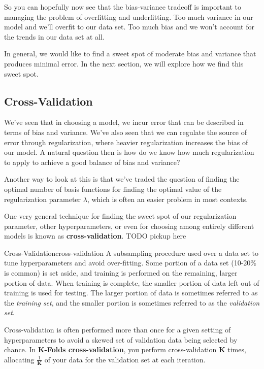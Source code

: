 So you can hopefully now see that the bias-variance tradeoff is important to managing the problem of overfitting and underfitting. Too much variance in our model and we'll overfit to our data set. Too much bias and we won't account for the trends in our data set at all.

In general, we would like to find a sweet spot of moderate bias and variance that produces minimal error. In the next section, we will explore how we find this sweet spot.

\subsection{Cross-Validation}
We've seen that in choosing a model, we incur error that can be described in terms of bias and variance. We've also seen that we can regulate the source of error through regularization, where heavier regularization increases the bias of our model. A natural question then is how do we know how much regularization to apply to achieve a good balance of bias and variance?

Another way to look at this is that we've traded the question of finding the optimal number of basis functions for finding the optimal value of the regularization parameter $\lambda$, which is often an easier problem in most contexts.

One very general technique for finding the sweet spot of our regularization parameter, other hyperparameters, or even for choosing among entirely different models is known as \textbf{cross-validation}. TODO pickup here

\begin{definition}{Cross-Validation}{cross-validation}
    A subsampling procedure used over a data set to tune hyperparameters and avoid over-fitting. Some portion of a data set (10-20\% is common) is set aside, and training is performed on the remaining, larger portion of data. When training is complete, the smaller portion of data left out of training is used for testing. The larger portion of data is sometimes referred to as the \textit{training set}, and the smaller portion is sometimes referred to as the \textit{validation set}.
\end{definition}

Cross-validation is often performed more than once for a given setting of hyperparameters to avoid a skewed set of validation data being selected by chance. In \textbf{K-Folds cross-validation}, you perform cross-validation \textbf{K} times, allocating $\frac{1}{\textbf{K}}$ of your data for the validation set at each iteration.


